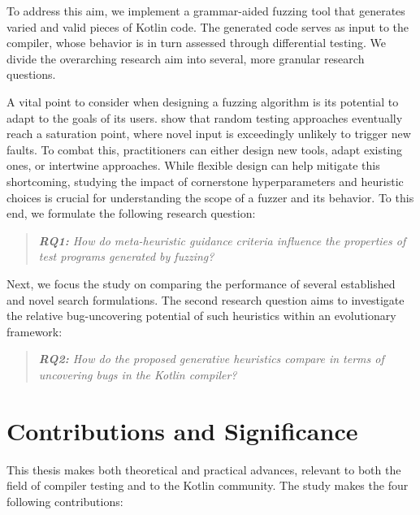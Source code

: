 To address this aim, we implement a grammar-aided fuzzing tool
that generates varied and valid pieces of Kotlin code. 
The generated code serves as input to the compiler,
whose behavior is in turn assessed through differential testing.
We divide the overarching research aim into several, more granular
research questions.

A vital point to consider when designing a fuzzing algorithm is
its potential to adapt to the goals of its users. \citet{amalfitano2015exploiting}
show that random testing approaches eventually reach a
saturation point, where novel input is exceedingly unlikely to trigger new faults. 
To combat this, practitioners can either design new tools, adapt existing
ones, or intertwine approaches.
While flexible design can help mitigate this shortcoming, studying the 
impact of cornerstone hyperparameters and heuristic choices
is crucial for understanding the scope of a fuzzer and its behavior.
To this end, we formulate the following research question:

\begin{quote}
\centering 
\emph{\textbf{RQ1:} How do meta-heuristic guidance
criteria influence the properties of test programs
generated by fuzzing?}
\end{quote}

Next, we focus the study on comparing the performance of
several established and novel search formulations.
The second research question aims to investigate
the relative bug-uncovering potential of such heuristics
within an evolutionary framework:

\begin{quote}
\centering 
\emph{\textbf{RQ2:} How do the proposed generative heuristics
compare in terms of uncovering bugs in the Kotlin compiler?}
\end{quote}


\section{Contributions and Significance}

This thesis makes both theoretical and practical advances,
relevant to both the field of compiler testing and to the 
Kotlin community.
The study makes the four following contributions:

